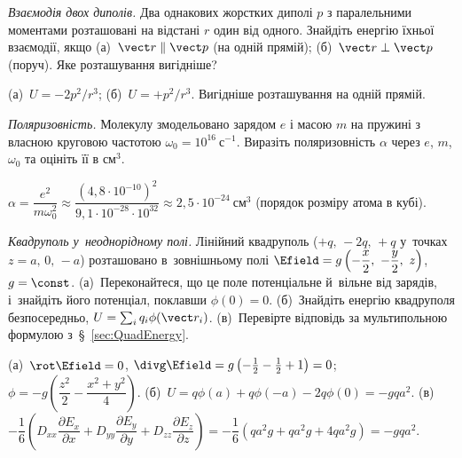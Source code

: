 \begin{problem}\label{prb:TwoDipoles}
	\emph{Взаємодія двох диполів.}
	Два однакових жорстких диполі $p$ з паралельними моментами розташовані на відстані $r$ один від одного. Знайдіть енергію їхньої взаємодії, якщо (а)~$\vect r\parallel\vect p$ (на одній прямій); (б)~$\vect r\perp\vect p$ (поруч). Яке розташування вигідніше?
	\begin{solution}
		(а)~$U=-2p^2/r^3$; (б)~$U=+p^2/r^3$. Вигідніше розташування на одній прямій.
	\end{solution}
\end{problem}


\begin{problem}\label{prb:Polarizability}
	\emph{Поляризовність.}
	Молекулу змодельовано зарядом $e$ і масою $m$ на пружині з власною круговою частотою $\omega_0=10^{16}\ \text{с}^{-1}$. Виразіть поляризовність $\alpha$ через $e$, $m$, $\omega_0$ та оцініть її в $\text{см}^3$.
	\begin{solution}
		$\alpha=\dfrac{e^2}{m\omega_0^2}\approx\dfrac{(4{,}8\cdot10^{-10})^2}{9{,}1\cdot10^{-28}\cdot10^{32}}\approx2{,}5\cdot10^{-24}\ \text{см}^3$ (порядок розміру атома в кубі).
	\end{solution}
\end{problem}


\begin{problem}\label{prb:QuadrupoleInField}
	\emph{Квадруполь у~неоднорідному полі\ExtraMark.}
	Лінійний квадруполь ($+q,\,-2q,\,+q$ у~точках $z=a,\,0,\,-a$) розташовано в~зовнішньому
	полі $\Efield=g\left(-\dfrac x2,\ -\dfrac y2,\ z\right)$, $g=\const$. (а)~Переконайтеся, що
	це поле потенціальне й~вільне від зарядів, і~знайдіть його потенціал, поклавши
	$\phi(0)=0$. (б)~Знайдіть енергію квадруполя безпосередньо, $U=\sum_i q_i\phi(\vect r_i)$.
	(в)~Перевірте відповідь за мультипольною формулою з~\S~\ref{sec:QuadEnergy}.
	\begin{solution}
		(а)~$\rot\Efield=0$, $\divg\Efield=g\left(-\tfrac12-\tfrac12+1\right)=0$; $\phi=-g\left(\dfrac{z^2}2-\dfrac{x^2+y^2}4\right)$. (б)~$U=q\phi(a)+q\phi(-a)-2q\phi(0)=-gqa^2$. (в)~$-\dfrac16\left(D_{xx}\dfrac{\partial E_x}{\partial x}+D_{yy}\dfrac{\partial E_y}{\partial y}+D_{zz}\dfrac{\partial E_z}{\partial z}\right)=-\dfrac16\left(qa^2g+qa^2g+4qa^2g\right)=-gqa^2$.
	\end{solution}
\end{problem}

